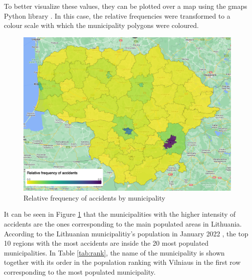 To better visualize these values, they can be plotted over a map using the gmaps Python library \cite{gmaps}. In this case, the relative frequencies were transformed to a colour scale with which the municipality polygons were coloured. 
\begin{figure}[H] 
\centering
\captionsetup{justification=centering}
\includegraphics[width=\textwidth]{Images/AccidentsMap.png}
\caption[Relative frequency of accidents by municipality]{Relative frequency of accidents by municipality}
\label{fig:accident_map}
\end{figure}

It can be seen in Figure \ref{fig:accident_map} that the municipalities with the higher intensity of accidents are the ones corresponding to the main populated areas in Lithuania.
According to the Lithuanian municipalitiy's population in January 2022 \cite{population}, the top 10 regions with the most accidents are inside the 20 most populated municipalities. In Table \ref{tab:rank}, the name of the municipality is shown together with its order in the population ranking with Vilniaus in the first row corresponding to the most populated municipality.

